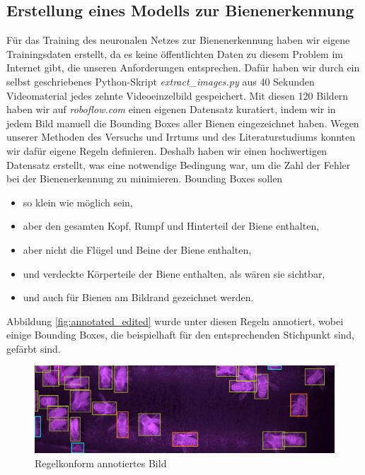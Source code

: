 \documentclass[11pt,a4paper]{article}
\begin{document}
\subsection{Erstellung eines Modells zur Bienenerkennung}
Für das Training des neuronalen Netzes zur Bienenerkennung haben wir eigene Trainingsdaten erstellt, da es keine öffentlichten Daten zu diesem Problem im Internet gibt, die unseren Anforderungen entsprechen. Dafür haben wir durch ein selbst geschriebenes Python-Skript \textit{extract\_images.py} aus 40 Sekunden Videomaterial jedes zehnte Videoeinzelbild gespeichert. Mit diesen 120 Bildern haben wir auf \textit{roboflow.com} einen eigenen Datensatz kuratiert, indem wir in jedem Bild manuell die Bounding Boxes aller Bienen eingezeichnet haben. Wegen unserer Methoden des Versuchs und Irrtums und des Literaturstudiums konnten wir dafür eigene Regeln definieren. Deshalb haben wir einen hochwertigen Datensatz erstellt, was eine notwendige Bedingung war, um die Zahl der Fehler bei der Bienenerkennung zu minimieren. Bounding Boxes sollen
\begin{itemize}
    \item[\textcolor{ora}{\textbullet}] so klein wie möglich sein,
    \item[\textcolor{ora}{\textbullet}] aber den gesamten Kopf, Rumpf und Hinterteil der Biene enthalten,
    \item[\textcolor{ora}{\textbullet}] aber nicht die Flügel und Beine der Biene enthalten,
    \item[\textcolor{pur}{\textbullet}] und verdeckte Körperteile der Biene enthalten, als wären sie sichtbar,
    \item[\textcolor{blu}{\textbullet}] und auch für Bienen am Bildrand gezeichnet werden.
\end{itemize}
Abbildung \autoref{fig:annotated_edited} wurde unter diesen Regeln annotiert, wobei einige Bounding Boxes, die beispielhaft für den entsprechenden Stichpunkt sind, gefärbt sind.
\begin{figure}[H]
    \centering
    \includegraphics[width = .8\textwidth]{images/annotated_edited.png}
    \caption{Regelkonform annotiertes Bild}
    \label{fig:annotated_edited}
\end{figure}
\end{document}
